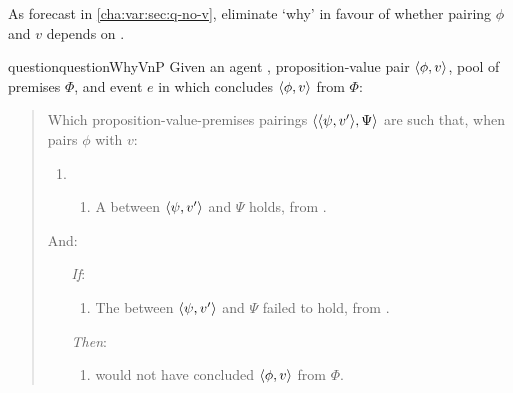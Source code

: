 \begin{note}
  As forecast in \autoref{cha:var:sec:q-no-v}, eliminate `why' in favour of whether pairing \(\phi\) and \(v\) depends on \ros{}.

  \begin{restatable}[\qWhyVnP{}]{question}{questionWhyVnP}
    \label{q:why:v:nP}
    Given an agent \vAgent{}, proposition-value pair \(\langle \phi, v \rangle\), pool of premises \(\Phi\), and event \(e\) in which \vAgent{} concludes \(\langle \phi, v \rangle\) from \(\Phi\):

    \begin{quote}
      Which proposition-value-premises pairings \(\langle \langle \psi, v' \rangle, \Psi \rangle\) are such that, when \vAgent{} pairs \(\phi\) with \(v\):

      \begin{enumerate}[label=]
      \item
        \begin{enumerate}[label=\alph*., ref=(\alph*), series=qWhyVnPdef]
        \item
          \label{q:why:v:a}
          A  between \(\langle \psi, v' \rangle\) and \(\Psi\) holds, from .
        \end{enumerate}
      \end{enumerate}

      And:

      \begin{enumerate}
      \item[\emph{If}:]
        \begin{enumerate}[label=\alph*., ref=(\alph*), resume*=qWhyVnPdef]
        \item
          \label{q:why:v:if}
          The  between \(\langle \psi, v' \rangle\) and \(\Psi\) failed to hold, from .
        \end{enumerate}
      \item[\emph{Then}:]
        \begin{enumerate}[label=\alph*., ref=(\alph*), resume*=qWhyVnPdef]
        \item
          \label{q:why:v:then}
          \vAgent{} would not have concluded \(\langle \phi, v \rangle\) from \(\Phi\).
        \end{enumerate}
      \end{enumerate}
    \end{quote}
    \vspace{-\baselineskip}
  \end{restatable}


\end{note}
